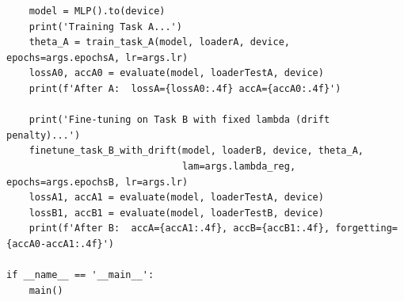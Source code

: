 \documentclass[9pt,a4paper]{extarticle}
\begin{document}
\begin{lstlisting}
    model = MLP().to(device)
    print('Training Task A...')
    theta_A = train_task_A(model, loaderA, device, epochs=args.epochsA, lr=args.lr)
    lossA0, accA0 = evaluate(model, loaderTestA, device)
    print(f'After A:  lossA={lossA0:.4f} accA={accA0:.4f}')

    print('Fine-tuning on Task B with fixed lambda (drift penalty)...')
    finetune_task_B_with_drift(model, loaderB, device, theta_A,
                               lam=args.lambda_reg, epochs=args.epochsB, lr=args.lr)
    lossA1, accA1 = evaluate(model, loaderTestA, device)
    lossB1, accB1 = evaluate(model, loaderTestB, device)
    print(f'After B:  accA={accA1:.4f}, accB={accB1:.4f}, forgetting={accA0-accA1:.4f}')

if __name__ == '__main__':
    main()
\end{lstlisting}
\end{document}
